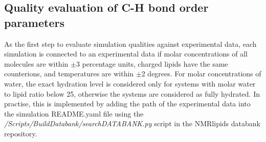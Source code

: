\documentclass[fleqn,10pt]{wlscirep}
\begin{document}
\subsection{Quality evaluation of C-H bond order parameters}
As the first step to evaluate simulation qualities against experimental data, each simulation is connected to an experimental data if molar concentrations of all molecules are within $\pm$3 percentage units, charged lipids have the same counterions, and temperatures are within $\pm$2 degrees. For molar concentrations of water, the exact hydration level is considered only for systems with molar water to lipid ratio below 25, otherwise the systems are considered as fully hydrated. In practise, this is implemented by adding the path of the experimental data into the simulation README.yaml file using the {\it /Scripts/BuildDatabank/searchDATABANK.py} script in the NMRlipids databank repository. 

%
\end{document}
